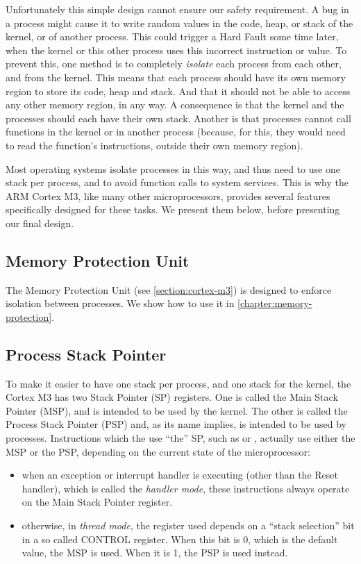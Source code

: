 Unfortunately this simple design cannot ensure our safety requirement. A bug in
a process might cause it to write random values in the code, heap, or stack of
the kernel, or of another process. This could trigger a Hard Fault some time
later, when the kernel or this other process uses this incorrect instruction or
value. To prevent this, one method is to completely {\em isolate} each process
from each other, and from the kernel. This means that each process should have
its own memory region to store its code, heap and stack. And that it should not
be able to access any other memory region, in any way. A consequence is that
the kernel and the processes should each have their own stack. Another is that
processes cannot call functions in the kernel or in another process (because,
for this, they would need to read the function's instructions, outside their
own memory region).

Most operating systems isolate processes in this way, and thus need to use one
stack per process, and to avoid function calls to system services. This is why
the ARM Cortex M3, like many other microprocessors, provides several features
specifically designed for these tasks. We present them below, before presenting
our final design.

\subsection{Memory Protection Unit}

The Memory Protection Unit (see \cref{section:cortex-m3}) is designed to
enforce isolation between processes. We show how to use it in
\cref{chapter:memory-protection}.

\subsection{Process Stack Pointer}\label{subsection:process-stack-pointer}

To make it easier to have one stack per process, and one stack for the kernel,
the Cortex M3 has two Stack Pointer (SP) registers. One is called the Main
Stack Pointer (MSP), and is intended to be used by the kernel. The other is
called the Process Stack Pointer (PSP) and, as its name implies, is intended to
be used by processes. Instructions which the use ``the'' SP, such as 
or , actually use either the MSP or the PSP, depending on the current
state of the microprocessor:
\begin{itemize}
  \item when an exception or interrupt handler is executing (other than the
  Reset handler), which is called the {\em handler mode}, these instructions
  always operate on the Main Stack Pointer register.

  \item otherwise, in {\em thread mode}, the register used depends on a ``stack
  selection'' bit in a so called CONTROL register. When this bit is 0, which is
  the default value, the MSP is used. When it is 1, the PSP is used instead.
\end{itemize}

